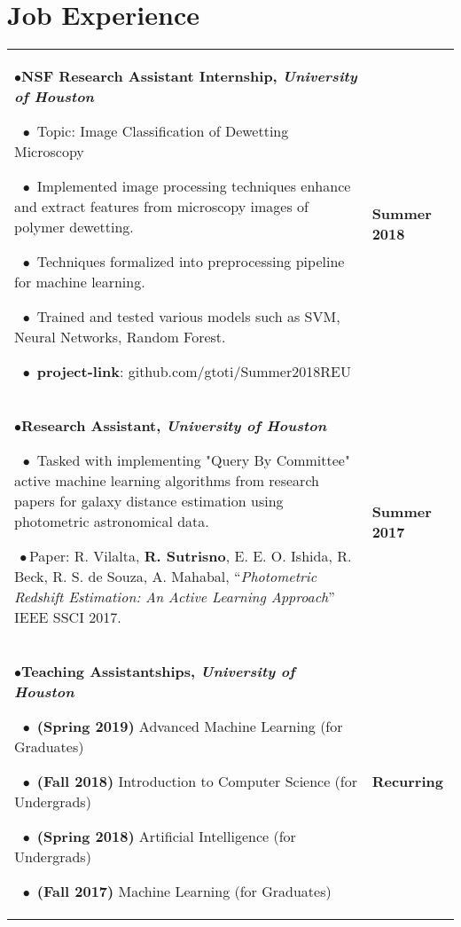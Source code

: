 \documentclass{article}
\begin{document}
\section{Job Experience}
\begin{flushleft}
\begin{tabular}{p{15.5cm} p{2.5cm}}

{$\bullet$}\textbf{NSF Research Assistant Internship, \textit{University of Houston}}

    $\ \ \bullet$ Topic: Image Classification of Dewetting Microscopy

    $\ \ \bullet$ Implemented image processing techniques enhance and extract features
    from microscopy images of polymer dewetting. 

    $\ \ \bullet$ Techniques formalized into preprocessing pipeline for machine learning.

    $\ \ \bullet$ Trained and tested various models such as SVM, Neural Networks, Random Forest.

    $\ \ \bullet$ \textbf{project-link}: github.com/gtoti/Summer2018REU

    & \textbf{Summer 2018}
    \\[1.00cm]

{$\bullet$}\textbf{Research Assistant, \textit{University of Houston}}

    $\ \ \bullet$ Tasked with implementing "Query By Committee" active machine learning algorithms from research papers for galaxy distance estimation using photometric astronomical data.

{$\ \bullet$}Paper: R. Vilalta, \textbf{R. Sutrisno}, E. E. O. Ishida, R. Beck, R. S. de Souza, A. Mahabal,
``\textit{Photometric Redshift Estimation: An Active Learning Approach}'' IEEE SSCI 2017.


    & \textbf{Summer 2017} \\

{$\bullet$}\textbf{Teaching Assistantships, \textit{University of Houston}}

    $\ \ \bullet$ \textbf{(Spring 2019)} Advanced Machine Learning (for Graduates) 

    $\ \ \bullet$ \textbf{(Fall 2018)}  Introduction to Computer Science (for Undergrads) 

    $\ \ \bullet$ \textbf{(Spring 2018)} Artificial Intelligence (for Undergrads) 

    $\ \ \bullet$ \textbf{(Fall 2017)}  Machine Learning (for Graduates) 

    &
    \textbf{Recurring}

\end{tabular}
\end{flushleft}
\end{document}
